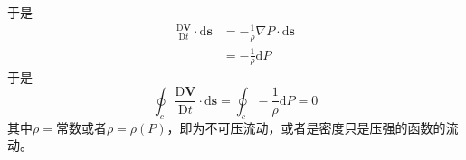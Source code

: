 于是
\[
  \begin{split}
    \frac{\mathrm{D} \mathbf{V}}{\mathrm{D} t}\cdot \mathrm{d}\mathbf{s}&=
    -\frac{1}{\rho}\nabla P \cdot \mathrm{d}\mathbf{s}\\                                                                      &=
     -\frac{1}{\rho}\mathrm{d}P
\end{split}
\]
于是
\[
  \oint _c 
    \frac{\mathrm{D} \mathbf{V}}{\mathrm{D} t}\cdot \mathrm{d}\mathbf{s}=
    \oint _c 
     -\frac{1}{\rho}\mathrm{d}P
     =0
\]
其中$\rho=常数$或者$\rho=\rho(P)$，即为不可压流动，或者是密度只是压强的函数的流动。

